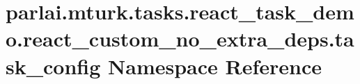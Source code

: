 \hypertarget{namespaceparlai_1_1mturk_1_1tasks_1_1react__task__demo_1_1react__custom__no__extra__deps_1_1task__config}{}\section{parlai.\+mturk.\+tasks.\+react\+\_\+task\+\_\+demo.\+react\+\_\+custom\+\_\+no\+\_\+extra\+\_\+deps.\+task\+\_\+config Namespace Reference}
\label{namespaceparlai_1_1mturk_1_1tasks_1_1react__task__demo_1_1react__custom__no__extra__deps_1_1task__config}

